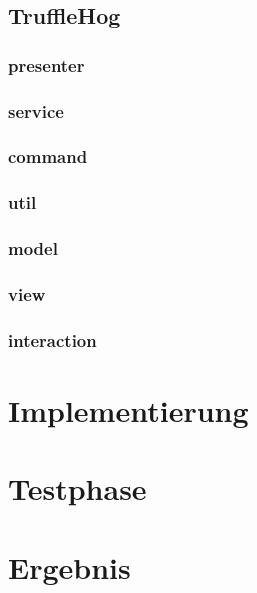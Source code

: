 \documentclass[18pt]{beamer}
\begin{document}
\subsection{TruffleHog}
	
	\subsubsection{presenter}
		
	\subsubsection{service}
		
	\subsubsection{command}
		
	\subsubsection{util}
		
	\subsubsection{model}
		
	\subsubsection{view}
		
	\subsubsection{interaction}
		
\fi


\section{Implementierung}
    
    

\section{Testphase}
    
    
    

\section{Ergebnis}
    
    
\end{document}
